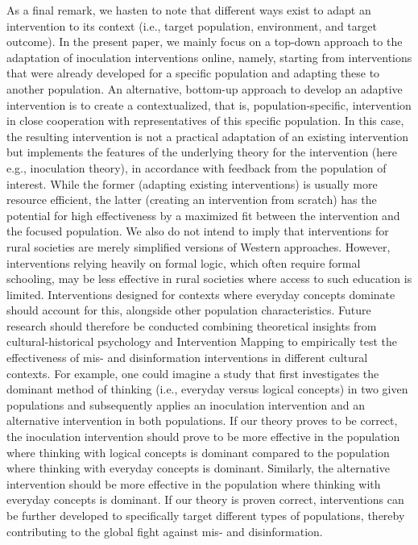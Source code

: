 \documentclass[authordate, empirical]{jote-new-article}
\begin{document}
	As a final remark, we hasten to note that different ways exist to adapt an intervention to its context (i.e., target population, environment, and target outcome). In the present paper, we mainly focus on a top-down approach to the adaptation of inoculation interventions online, namely, starting from interventions that were already developed for a specific population and adapting these to another population. An alternative, bottom-up approach to develop an adaptive intervention is to create a contextualized, that is, population-specific, intervention in close cooperation with representatives of this specific population. In this case, the resulting intervention is not a practical adaptation of an existing intervention but implements the features of the underlying theory for the intervention (here e.g., inoculation theory), in accordance with feedback from the population of interest. While the former (adapting existing interventions) is usually more resource efficient, the latter (creating an intervention from scratch) has the potential for high effectiveness by a maximized fit between the intervention and the focused population. We also do not intend to imply that interventions for rural societies are merely simplified versions of Western approaches. However, interventions relying heavily on formal logic, which often require formal schooling, may be less effective in rural societies where access to such education is limited. Interventions designed for contexts where everyday concepts dominate should account for this, alongside other population characteristics. Future research should therefore be conducted combining theoretical insights from cultural-historical psychology and Intervention Mapping to empirically test the effectiveness of mis- and disinformation interventions in different cultural contexts. For example, one could imagine a study that first investigates the dominant method of thinking (i.e., everyday versus logical concepts) in two given populations and subsequently applies an inoculation intervention and an alternative intervention in both populations. If our theory proves to be correct, the inoculation intervention should prove to be more effective in the population where thinking with logical concepts is dominant compared to the population where thinking with everyday concepts is dominant. Similarly, the alternative intervention should be more effective in the population where thinking with everyday concepts is dominant. If our theory is proven correct, interventions can be further developed to specifically target different types of populations, thereby contributing to the global fight against mis- and disinformation.
\end{document}
